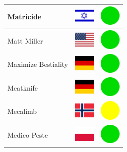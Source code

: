 \documentclass[12pt, a4paper, twoside]{report}
\begin{document}
\begin{center}
\begin{longtable}{|p{5cm}|p{2cm}|p{2cm}|}
 Matricide                                                  & \includegraphics[width=1cm]{../img/flags/il} &   \includegraphics[width=1cm]{../likes/y} \\ \hline
 Matt Miller                                                & \includegraphics[width=1cm]{../img/flags/us} &   \includegraphics[width=1cm]{../likes/y} \\ \hline
 Maximize Bestiality                                        & \includegraphics[width=1cm]{../img/flags/de} &   \includegraphics[width=1cm]{../likes/y} \\ \hline
 Meatknife                                                  & \includegraphics[width=1cm]{../img/flags/de} &   \includegraphics[width=1cm]{../likes/y} \\ \hline
 Mecalimb                                                   & \includegraphics[width=1cm]{../img/flags/no} &   \includegraphics[width=1cm]{../likes/m} \\ \hline
 Medico Peste                                               & \includegraphics[width=1cm]{../img/flags/pl} &   \includegraphics[width=1cm]{../likes/y} \\ \hline

\end{longtable}
\end{center}
\end{document}
